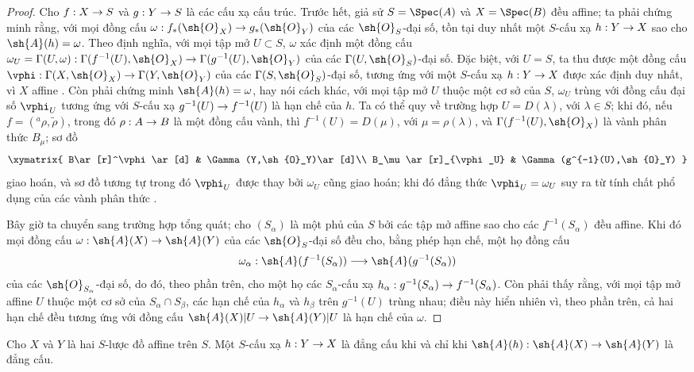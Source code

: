 \documentclass[oneside,10pt]{amsart}
\makeatletter
\newcommand{\ega@arrow}[2]{\mathchoice{#1}{#2}{#2}{#2}}
\renewcommand{\to}{\ega@arrow{\longrightarrow}{\rightarrow}}
\newcommand{\oldpage}[2][]{\marginnote{\normalfont\footnotesize\textbf{#1}~|~#2}\ignorespaces}
\let\EGAOriginalLabel\label
\renewcommand{\label}[1]{\phantomsection\EGAOriginalLabel{#1}}
\makeatother
\begin{document}
\begin{proof}
Cho $f:X\to S$ và $g:Y\to S$ là các cấu xạ cấu trúc.
Trước hết, giả sử $S=\Spec(A)$ và $X=\Spec(B)$ đều affine; ta phải chứng minh rằng, với mọi đồng cấu $\omega:f_*(\sh{O}_X)\to g_*(\sh{O}_Y)$ của các $\sh{O}_S$-đại số, tồn tại duy nhất một $S$-cấu xạ $h:Y\to X$ sao cho $\sh{A}(h)=\omega$.
Theo định nghĩa, với mọi tập mở $U\subset S$, $\omega$ xác định một đồng cấu $\omega_U=\Gamma(U,\omega):\Gamma(f^{-1}(U),\sh{O}_X)\to\Gamma(g^{-1}(U),\sh{O}_Y)$ của các $\Gamma(U,\sh{O}_S)$-đại số.
Đặc biệt, với $U=S$, ta thu được một đồng cấu $\vphi:\Gamma(X,\sh{O}_X)\to\Gamma(Y,\sh{O}_Y)$ của các $\Gamma(S,\sh{O}_S)$-đại số, tương ứng với một $S$-cấu xạ $h:Y\to X$ được xác định duy nhất, vì $X$ affine .
Còn phải chứng minh $\sh{A}(h)=\omega$, hay nói cách khác, với mọi tập mở $U$ thuộc một cơ sở của $S$, $\omega_U$ trùng với đồng cấu đại số $\vphi_U$ tương ứng với $S$-cấu xạ $g^{-1}(U)\to f^{-1}(U)$ là hạn chế của $h$.
Ta có thể quy về trường hợp $U=D(\lambda)$, với $\lambda\in S$; khi đó, nếu $f=({}^a\rho,\widetilde{\rho})$, trong đó $\rho:A\to B$ là một đồng cấu vành, thì $f^{-1}(U)=D(\mu)$, với $\mu=\rho(\lambda)$, và $\Gamma(f^{-1}(U),\sh{O}_X)$ là vành phân thức $B_\mu$; sơ đồ
\[
  \xymatrix{
    B\ar[r]^\vphi\ar[d] &
    \Gamma(Y,\sh{O}_Y)\ar[d]\\
    B_\mu\ar[r]_{\vphi_U} &
    \Gamma(g^{-1}(U),\sh{O}_Y)
  }
\]
giao hoán, và sơ đồ tương tự trong đó $\vphi_U$ được thay bởi $\omega_U$ cũng giao hoán; khi đó đẳng thức $\vphi_U=\omega_U$ suy ra từ tính chất phổ dụng của các vành phân thức .

Bây giờ ta chuyển sang trường hợp tổng quát; cho $(S_\alpha)$ là một phủ của $S$ bởi các tập mở affine
\oldpage[II]{8}
sao cho các $f^{-1}(S_\alpha)$ đều affine.
Khi đó mọi đồng cấu $\omega:\sh{A}(X)\to\sh{A}(Y)$ của các $\sh{O}_S$-đại số đều cho, bằng phép hạn chế, một họ đồng cấu
\[
  \omega_\alpha:\sh{A}(f^{-1}(S_\alpha))\to\sh{A}(g^{-1}(S_\alpha))
\]
của các $\sh{O}_{S_\alpha}$-đại số, do đó, theo phần trên, cho một họ các $S_\alpha$-cấu xạ $h_\alpha:g^{-1}(S_\alpha)\to f^{-1}(S_\alpha)$.
Còn phải thấy rằng, với mọi tập mở affine $U$ thuộc một cơ sở của $S_\alpha\cap S_\beta$, các hạn chế của $h_\alpha$ và $h_\beta$ trên $g^{-1}(U)$ trùng nhau; điều này hiển nhiên vì, theo phần trên, cả hai hạn chế đều tương ứng với đồng cấu $\sh{A}(X)|U\to\sh{A}(Y)|U$ là hạn chế của $\omega$.
\end{proof}

\begin{corollary}[1.2.8]
\label{II.1.2.8}
Cho $X$ và $Y$ là hai $S$-lược đồ affine trên $S$.
Một $S$-cấu xạ $h:Y\to X$ là đẳng cấu khi và chỉ khi $\sh{A}(h):\sh{A}(X)\to\sh{A}(Y)$ là đẳng cấu.
\end{corollary}
\end{document}

